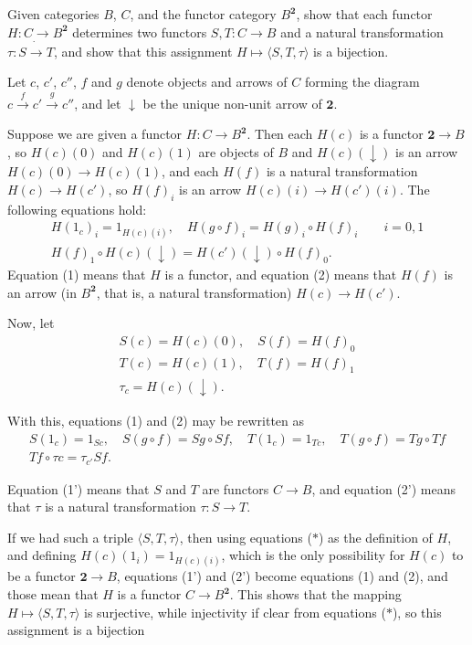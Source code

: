\begin{exercise}
Given categories $B$, $C$, and the functor category $B^\mathbf{2}$, show that each functor $H:C\to B^\mathbf{2}$ determines two functors $S,T:C\to B$ and a natural transformation $\tau:S\dot{\to} T$, and show that this assignment $H\mapsto\langle S,T,\tau\rangle$ is a bijection.
\end{exercise}
\begin{solution}
Let $c$, $c'$, $c''$, $f$ and $g$ denote objects and arrows of $C$ forming the diagram $c\overset{f}{\to}c'\overset{g}{\to}c''$, and let $\downarrow$ be the unique non-unit arrow of $\mathbf{2}$.

Suppose we are given a functor $H:C\to B^\mathbf{2}$. Then each $H(c)$ is a functor $\mathbf{2}\to B$, so $H(c)(0)$ and $H(c)(1)$ are objects of $B$ and $H(c)(\downarrow)$ is an arrow $H(c)(0)\to H(c)(1)$, and each $H(f)$ is a natural transformation $H(c)\to H(c')$, so $H(f)_i$ is an arrow $H(c)(i)\to H(c')(i)$. The following equations hold:
\begin{gather*}
H(1_c)_i=1_{H(c)(i)},\quad H(g\circ f)_i=H(g)_i\circ H(f)_i\qquad i=0,1\tag{1}\\
H(f)_1\circ H(c)(\downarrow)=H(c')(\downarrow)\circ H(f)_0.\tag{2}
\end{gather*}
Equation (1) means that $H$ is a functor, and equation (2) means that $H(f)$ is an arrow (in $B^\mathbf{2}$, that is, a natural transformation) $H(c)\to H(c')$.

Now, let
\begin{gather*}
S(c)=H(c)(0),\quad S(f)=H(f)_0\\
T(c)=H(c)(1),\quad T(f)=H(f)_1\tag{$*$}\\
\tau_c=H(c)(\downarrow).
\end{gather*}

With this, equations (1) and (2) may be rewritten as
\begin{gather*}
S(1_c)=1_{Sc},\quad S(g\circ f)=Sg\circ Sf,\quad T(1_c)=1_{Tc},\quad T(g\circ f)=Tg\circ Tf\tag{1'}\\
Tf\circ\tau c=\tau_{c'} Sf.\tag{2'}
\end{gather*}

Equation (1') means that $S$ and $T$ are functors $C\to B$, and equation (2') means that $\tau$ is a natural transformation $\tau:S\to T$.

If we had such a triple $\langle S,T,\tau\rangle$, then using equations ($*$) as the definition of $H$, and defining $H(c)(1_i)=1_{H(c)(i)}$, which is the only possibility for $H(c)$ to be a functor $\mathbf{2}\to B$, equations (1') and (2') become equations (1) and (2), and those mean that $H$ is a functor $C\to B^\mathbf{2}$. This shows that the mapping $H\mapsto\langle S,T,\tau\rangle$ is surjective, while injectivity if clear from equations ($*$), so this assignment is a bijection
\end{solution}

